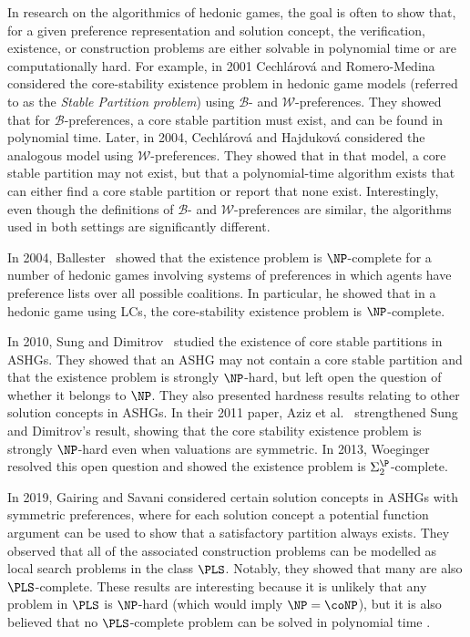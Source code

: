In research on the algorithmics of hedonic games, the goal is often to show that, for a given preference representation and solution concept, the verification, existence, or construction problems are either solvable in polynomial time or are computationally hard. For example, in 2001 Cechl\'arov\'a and Romero-Medina~\cite{CR01} considered the core-stability existence problem in hedonic game models (referred to as the \emph{Stable Partition problem}) using $\mathscr{B}$- and $\mathscr{W}$-preferences. They showed that for $\mathscr{B}$-preferences, a core stable partition must exist, and can be found in polynomial time. Later, in 2004, Cechl\'arov\'a and Hajdukov\'a considered the analogous model using $\mathscr{W}$-preferences. They showed that in that model, a core stable partition may not exist, but that a polynomial-time algorithm exists that can either find a core stable partition or report that none exist. Interestingly, even though the definitions of $\mathscr{B}$- and $\mathscr{W}$-preferences are similar, the algorithms used in both settings are significantly different. 

In 2004, Ballester~\cite{Bal04} showed that the existence problem is $\NP$-complete for a number of hedonic games involving systems of preferences in which agents have preference lists over all possible coalitions. In particular, he showed that in a hedonic game using LCs, the core-stability existence problem is $\NP$-complete.

In 2010, Sung and Dimitrov~\cite{SUNG2010635} studied the existence of core stable partitions in ASHGs. They showed that an ASHG may not contain a core stable partition and that the existence problem is strongly $\NP$-hard, but left open the question of whether it belongs to $\NP$. They also presented hardness results relating to other solution concepts in ASHGs. In their 2011 paper, Aziz et al.~\cite{AZIZ2013316} strengthened Sung and Dimitrov's result, showing that the core stability existence problem is strongly $\NP$-hard even when valuations are symmetric. In 2013, Woeginger~\cite{WOEGINGER2013101} resolved this open question and showed the existence problem is $\Sigma_2^\P$-complete.

In 2019, Gairing and Savani \cite{GairingSavani19} considered certain solution concepts in ASHGs with symmetric preferences, where for each solution concept a potential function argument can be used to show that a satisfactory partition always exists. They observed that all of the associated construction problems can be modelled as local search problems in the class $\PLS$. Notably, they showed that many are also $\PLS$-complete. These results are interesting because it is unlikely that any problem in $\PLS$ is $\NP$-hard (which would imply $\NP=\coNP$), but it is also believed that no $\PLS$-complete problem can be solved in polynomial time \cite{JohnsonPapaYanna88}.

